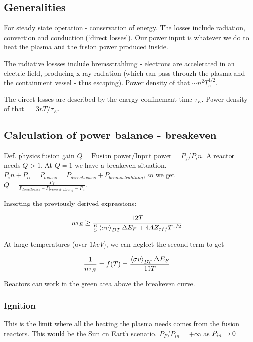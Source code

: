 \documentclass[PlasmaNotes.tex]{subfiles}
\begin{document}
\subsection{Generalities}

For steady state operation - conservation of energy. The losses include radiation, convection and conduction (`direct losses'). Our power input is whatever we do to heat the plasma and the fusion power produced inside.

The radiative lossses include bremsstrahlung - electrons are accelerated in an electric field, producing x-ray radiation (which can pass through the plasma and the containment vessel - thus escaping). Power density of that $\sim n^2 T_e^{1/2}$.

The direct losses are described by the energy confinement time $\tau_E$. Power density of that $=3nT/\tau_E$.

\subsection{Calculation of power balance - breakeven}

Def. physics fusion gain $Q=\text{Fusion power/Input power} = P_f/P_in$. A reactor needs $Q>1$. At $Q=1$ we have a breakeven situation. $P_in + P_\alpha = P_{losses} = P_{direct losses} + P_{bremsstrahlung}$, so we get $Q=\frac{P_f}{P_{direct losses} + P_{bremsstrahlung} - P_{\alpha}}$.

Inserting the previously derived expressions:

\begin{equation}
 n \tau_E \geq \frac{12 T}{\frac{6}{5} \left< \sigma v \right>_{DT} \Delta E_F + 4 A Z_{eff} T^{1/2}}
\end{equation}

At large temperatures (over $1 keV$), we can neglect the second term to get

\begin{equation}
\frac{1}{n \tau_E} = f(T) = \frac{\left< \sigma v \right>_{DT} \Delta E_F}{10 T}
\end{equation}


Reactors can work in the green area above the breakeven curve.

\subsubsection{Ignition}

This is the limit where all the heating the plasma needs comes from the fusion reactors. This would be the Sun on Earth scenario. $P_F/P_{in} = +\infty$ as $P_{in} \rightarrow 0$
\end{document}

